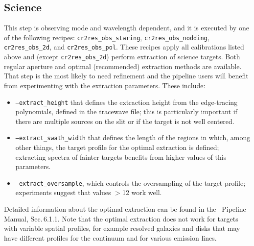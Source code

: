 \subsection{Science}

This step is observing mode and wavelength dependent, and it is executed by one of the following recipes: {\tt cr2res\_obs\_staring}, {\tt cr2res\_obs\_nodding}, {\tt cr2res\_obs\_2d}, and {\tt cr2res\_obs\_pol}. These recipes apply all calibrations listed above and (except {\tt cr2res\_obs\_2d}) perform extraction of science targets. Both regular aperture and optimal (recommended) extraction methods are available. That step is the most likely to need refinement and the pipeline users will benefit from experimenting with the extraction parameters. These include: 
\begin{itemize}
\item {\tt ---extract\_height} that defines the extraction height from the edge-tracing polynomials, defined in the tracewave file; this is particularly important if there are multiple sources on the slit or if the target is not well centered. 
\item {\tt ---extract\_swath\_width} that defines the length of the regions in which, among other things, the target profile for the optimal extraction is defined; extracting spectra of fainter targets benefits from higher values of this parameters.
\item {\tt ---extract\_oversample}, which controls the oversampling of the target profile; experiments suggest that values $>$12 work well.
\end{itemize}
Detailed information about the optimal extraction can be found in the \instname\ Pipeline Manual, Sec.\,6.1.1. Note that the optimal extraction does not work for targets with variable spatial profiles, for example resolved galaxies and disks that may have different profiles for the continuum and for various emission lines.
